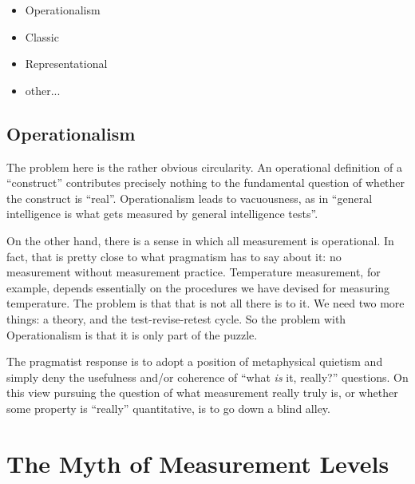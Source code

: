 \documentclass[11pt,twoside]{article}
\begin{document}
\begin{itemize}
\item Operationalism
\item Classic
\item Representational
\item other...
\end{itemize}

\subsection{Operationalism}

The problem here is the rather obvious circularity.  An operational
definition of a ``construct'' contributes precisely nothing to the
fundamental question of whether the construct is ``real''.
Operationalism leads to vacuousness, as in ``general intelligence is
what gets measured by general intelligence tests''.

On the other hand, there is a sense in which all measurement is
operational.  In fact, that is pretty close to what pragmatism has to
say about it: no measurement without measurement practice.
Temperature measurement, for example, depends essentially on the
procedures we have devised for measuring temperature.  The problem is
that that is not all there is to it.  We need two more things: a
theory, and the test-revise-retest cycle.  So the problem with
Operationalism is that it is only part of the puzzle.

The pragmatist response is to adopt a position of metaphysical
quietism and simply deny the usefulness and/or coherence of ``what
\textit{is} it, really?'' questions.  On this view pursuing the
question of what measurement really truly is, or whether some property
is ``really'' quantitative, is to go down a blind alley.


\clearpage
\section{The Myth of Measurement Levels}
\end{document}
